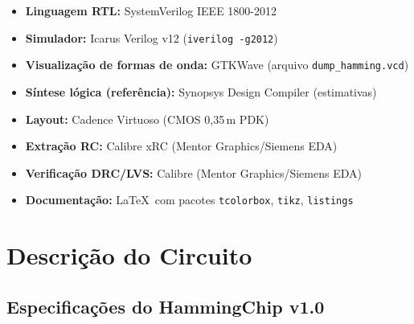 \documentclass[12pt,a4paper]{article}
\begin{document}
\begin{itemize}[leftmargin=1.5em]
  \item \textbf{Linguagem RTL:} SystemVerilog IEEE 1800-2012
  \item \textbf{Simulador:} Icarus Verilog v12 (\texttt{iverilog -g2012})
  \item \textbf{Visualização de formas de onda:} GTKWave (arquivo \texttt{dump\_hamming.vcd})
  \item \textbf{Síntese lógica (referência):} Synopsys Design Compiler (estimativas)
  \item \textbf{Layout:} Cadence Virtuoso (CMOS 0,35\,\textmu m PDK)
  \item \textbf{Extração RC:} Calibre xRC (Mentor Graphics/Siemens EDA)
  \item \textbf{Verificação DRC/LVS:} Calibre (Mentor Graphics/Siemens EDA)
  \item \textbf{Documentação:} \LaTeX\ com pacotes \texttt{tcolorbox}, \texttt{tikz}, \texttt{listings}
\end{itemize}

\section{Descrição do Circuito}

\subsection{Especificações do HammingChip v1.0}
\end{document}
